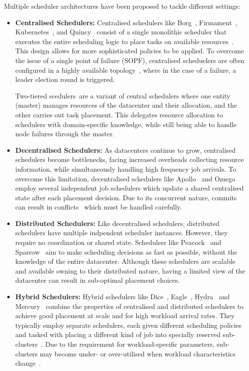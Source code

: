 Multiple scheduler architectures have been proposed to tackle different
settings:
\begin{itemize}
    \item \textbf{Centralised Schedulers:} Centralised schedulers like
        Borg~\cite{}, Firmament~\cite{}, Kubernetes~\cite{}, and Quincy~\cite{}
        consist of a single monolithic scheduler that executes the entire
        scheduling logic to place tasks on available resources~\cite{}. This
        design allows for more sophisticated policies to be applied. To overcome the
        issue of a single point of failure (SOPF), centralised scheduelers are
        often configured in a highly available topology~\cite{14, 109, 115},
        where in the case of a failure, a leader election round is triggered.

        Two-tiered scedulers~\cite{60}are a variant of central schedulers where
        one entity (master) manages resources of the datacenter and their
        allocation, and the other carries out task placement. This delegates
        resource allocation to schedulers with domain-specific knowledge, while
        still being able to handle node failures through the master.
    \item \textbf{Decentralised Schedulers:} As datacenters continue to grow,
        centralised schedulers become bottlenecks, facing increased overheads
        collecting resource information, while simultaneously handling high
        frequency job arrivals. To overcome this limitation, decentralised
        schedulers like Apollo~\cite{} and Omega~\cite{} employ several
        independent job schedulers which update a shared centralised state after
        each placement decision. Due to its concurrent nature, commits can
        result in conflicts~\cite{101} which must be handled carefully.
    \item \textbf{Distributed Schedulers:} Like decentralised schedulers,
        distributed schedulers have multiple indpendent scheduler instances.
        However, they require no coordination or shared state. Schedulers like
        Peacock~\cite{73} and Sparrow~\cite{90} aim to make scheduling decisions
        as fast as possible, without the knowledge of the entire datacenter.
        Although these schedulers are scalable and available owning to their
        distributed nature, having a limited view of the datacenter can result
        in sub-optimal placement choices.
    \item \textbf{Hybrid Schedulers:} Hybrid schedulers like Dice~\cite{130},
        Eagle~\cite{31}, Hydra~\cite{44} and Mercury~\cite{71} combine the
        properties of centralised and distributed schedulers to achieve good
        placement at scale and for high workload arrival rates. They typically
        employ separate schedulers, each given different scheduling policies and
        tasked with placing a different kind of job into specially reserved
        sub-clusters~\cite{31,33,71,123}. Due to the requirement for
        workload-specific parameters, sub-clusters may become under- or
        over-utilised when workload characteristics change~\cite{46}.
\end{itemize}

